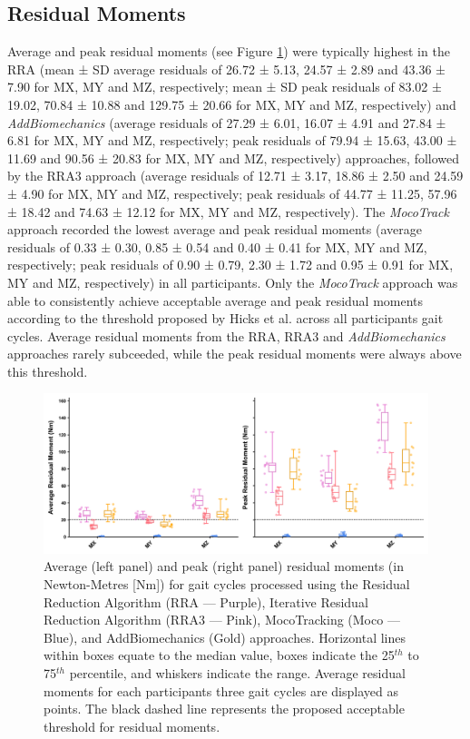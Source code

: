 \documentclass[]{elsarticle} %
\begin{document}
\hypertarget{residual-moments}{%
\subsection{Residual Moments}\label{residual-moments}}

Average and peak residual moments (see Figure \ref{fig:residualMoments})
were typically highest in the RRA (mean ± SD average residuals of 26.72
± 5.13, 24.57 ± 2.89 and 43.36 ± 7.90 for MX, MY and MZ, respectively;
mean ± SD peak residuals of 83.02 ± 19.02, 70.84 ± 10.88 and 129.75 ±
20.66 for MX, MY and MZ, respectively) and \emph{AddBiomechanics}
(average residuals of 27.29 ± 6.01, 16.07 ± 4.91 and 27.84 ± 6.81 for
MX, MY and MZ, respectively; peak residuals of 79.94 ± 15.63, 43.00 ±
11.69 and 90.56 ± 20.83 for MX, MY and MZ, respectively) approaches,
followed by the RRA3 approach (average residuals of 12.71 ± 3.17, 18.86
± 2.50 and 24.59 ± 4.90 for MX, MY and MZ, respectively; peak residuals
of 44.77 ± 11.25, 57.96 ± 18.42 and 74.63 ± 12.12 for MX, MY and MZ,
respectively). The \emph{MocoTrack} approach recorded the lowest average
and peak residual moments (average residuals of 0.33 ± 0.30, 0.85 ± 0.54
and 0.40 ± 0.41 for MX, MY and MZ, respectively; peak residuals of 0.90
± 0.79, 2.30 ± 1.72 and 0.95 ± 0.91 for MX, MY and MZ, respectively) in
all participants. Only the \emph{MocoTrack} approach was able to
consistently achieve acceptable average and peak residual moments
according to the threshold proposed by Hicks et al. \citep{Hicks2015}
across all participants gait cycles. Average residual moments from the
RRA, RRA3 and \emph{AddBiomechanics} approaches rarely subceeded, while
the peak residual moments were always above this threshold.

\begin{figure}

{\centering \includegraphics[width=1\linewidth]{../results/HamnerDelpDataset/figures/residualMoments} 

}

\caption{Average (left panel) and peak (right panel) residual moments (in Newton-Metres [Nm]) for gait cycles processed using the Residual Reduction Algorithm (RRA — Purple), Iterative Residual Reduction Algorithm  (RRA3 — Pink), MocoTracking (Moco — Blue), and AddBiomechanics (Gold) approaches. Horizontal lines within boxes equate to the median value, boxes indicate the 25$^{th}$ to 75$^{th}$ percentile, and whiskers indicate the range. Average residual moments for each participants three gait cycles are displayed as points. The black dashed line represents the proposed acceptable threshold for residual moments.}\label{fig:residualMoments}
\end{figure}
\end{document}

